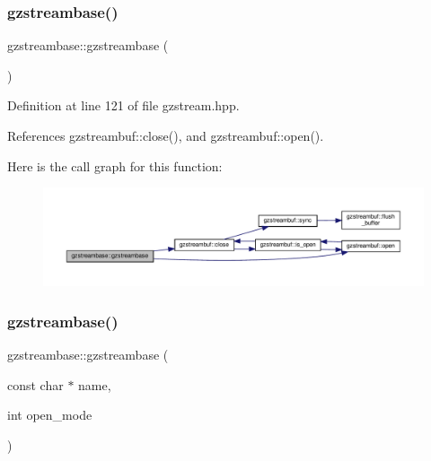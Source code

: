 \subsubsection{\texorpdfstring{gzstreambase()}{gzstreambase()}\hspace{0.1cm}{\footnotesize\ttfamily [1/2]}}
{\footnotesize\ttfamily gzstreambase\+::gzstreambase (\begin{DoxyParamCaption}{ }\end{DoxyParamCaption})\hspace{0.3cm}{\ttfamily [inline]}}



Definition at line 121 of file gzstream.\+hpp.



References gzstreambuf\+::close(), and gzstreambuf\+::open().

Here is the call graph for this function\+:
\nopagebreak
\begin{figure}[H]
\begin{center}
\leavevmode
\includegraphics[width=350pt]{dc/d09/classgzstreambase_af4d635149fd9d9e96cd5b803adeccc62_cgraph}
\end{center}
\end{figure}
\mbox{\label{classgzstreambase_a258adf33ea797692dc3953f514da86de}} 
\subsubsection{\texorpdfstring{gzstreambase()}{gzstreambase()}\hspace{0.1cm}{\footnotesize\ttfamily [2/2]}}
{\footnotesize\ttfamily gzstreambase\+::gzstreambase (\begin{DoxyParamCaption}\item[{const char $\ast$}]{name,  }\item[{int}]{open\+\_\+mode }\end{DoxyParamCaption})\hspace{0.3cm}{\ttfamily [inline]}}






